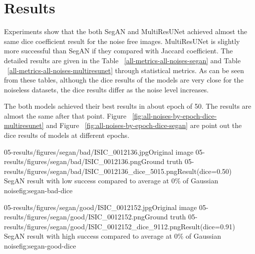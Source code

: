 \chapter{Results}

    Experiments show that the both SegAN and MultiResUNet achieved almost the same dice coefficient result for the noise free images.
    MultiResUNet is slightly more successful than SegAN if they compared with Jaccard coefficient.
    The detailed results are given in the Table ~\ref{all-metrics-all-noises-segan} and Table ~\ref{all-metrics-all-noises-multiresunet} through statistical metrics.
    As can be seen from these tables, although the dice results of the models are very close for the noiseless datasets, the dice results differ as the noise level increases.

    The both models achieved their best results in about epoch of 50. The results are almost the same after that point.
    Figure ~\ref{fig:all-noises-by-epoch-dice-multiresunet} and Figure ~\ref{fig:all-noises-by-epoch-dice-segan} are point out the dice results of models at different epochs.


    \sidebyside
        {05-results/figures/segan/bad/ISIC_0012136.jpg}{Original image}
        {05-results/figures/segan/bad/ISIC_0012136.png}{Ground truth}
        {05-results/figures/segan/bad/ISIC_0012136_dice_5015.png}{Result(dice=0.50)}
        {SegAN result with low success compared to average at 0\% of Gaussian noise}{fig:segan-bad-dice}

    \sidebyside
        {05-results/figures/segan/good/ISIC_0012152.jpg}{Original image}
        {05-results/figures/segan/good/ISIC_0012152.png}{Ground truth}
        {05-results/figures/segan/good/ISIC_0012152_dice_9112.png}{Result(dice=0.91)}
        {SegAN result with high success compared to average at 0\% of Gaussian noise}{fig:segan-good-dice}

    



